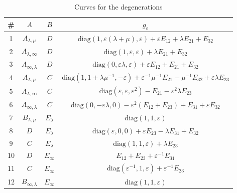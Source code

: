 \documentclass[12pt]{amsart}
\newcommand{\diag}{\mathrm{diag}}
\begin{document}
\begin{table}[ht]
\centering
\small
\caption{Curves for the degenerations}
\label{table:denerations}
\centering
{\renewcommand{\arraystretch}{2}
\setlength{\tabcolsep}{8pt}
\begin{tabular}{|c||c||c||c|}
\hline
\textbf{\#} & $A$ & $B$ & $g_\varepsilon$ \\
\hline\hline
1 & $A_{\lambda, \mu}$ & $D$ & $\diag(1, \varepsilon(\lambda + \mu), \varepsilon) + \varepsilon E_{12} + \lambda E_{21} + E_{32}$ \\
\hline\hline
2 & $A_{\lambda, \infty}$ & $D$ & $\diag(1, \varepsilon, \varepsilon) + \lambda  E_{21} +  E_{32}$ \\
\hline\hline
3 & $A_{\infty, \lambda}$ & $D$ & $\diag(0, \varepsilon \lambda, \varepsilon) + \varepsilon E_{12} + E_{21} + E_{32}$ \\
\hline\hline
4 & $A_{\lambda, \mu}$ & $C$ & $\diag(1, 1+\lambda\mu^{-1}, -\varepsilon)
+ \varepsilon^{-1} \mu^{-1} E_{21} - \mu^{-1} E_{32} +\varepsilon \lambda E_{23}$ \\
\hline\hline
5 & $A_{\lambda, \infty}$ & $C$ & $\diag(\varepsilon, \varepsilon, \varepsilon^2) - E_{21} - \varepsilon^2 \lambda E_{23}$ \\
\hline\hline
6 & $A_{\infty, \lambda}$ & $C$ & $\diag(0, -\varepsilon \lambda, 0) - \varepsilon^{2}(E_{12} + E_{23}) + E_{31} + \varepsilon E_{32}$ \\
\hline\hline
7 & $B_{\lambda, \mu}$ & $E_\lambda$ & $\diag(1, 1, \varepsilon)$ \\
\hline\hline
8 & $D$ & $E_{\lambda}$ & $\diag(\varepsilon, 0, 0) + \varepsilon E_{23} - \lambda E_{31} + E_{32}$ \\
\hline\hline
9 & $C$ & $E_{\lambda}$ & $\diag(1, 1, \varepsilon) +  \lambda E_{23}$ \\
\hline\hline
10 & $D$ & $E_{\infty}$ & $E_{12} + E_{23} + \varepsilon^{-1} E_{31}$ \\
\hline\hline
11 & $C$ & $E_{\infty}$ & $\diag(\varepsilon^{-1}, 1, \varepsilon) + \varepsilon^{-1} E_{23}$ \\
\hline\hline
12 & $B_{\infty, \lambda}$ & $E_{\infty}$ & $\diag(1, 1, \varepsilon)$ \\
\hline
\end{tabular}
}
\end{table}

\newpage
\end{document}
